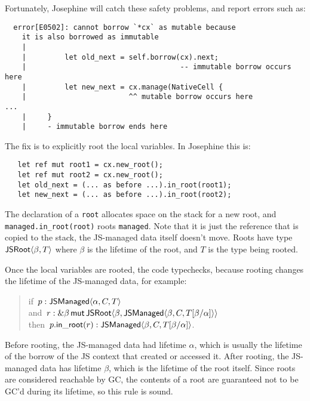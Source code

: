 Fortunately, Josephine will catch these safety problems, and report
errors such as:
\begin{verbatim}
  error[E0502]: cannot borrow `*cx` as mutable because
    it is also borrowed as immutable
    |
    |         let old_next = self.borrow(cx).next;
    |                                    -- immutable borrow occurs here
    |         let new_next = cx.manage(NativeCell {
    |                        ^^ mutable borrow occurs here
...
    |     }
    |     - immutable borrow ends here
\end{verbatim}
The fix is to explicitly root the local variables. In Josephine this is:
\begin{verbatim}
   let ref mut root1 = cx.new_root();
   let ref mut root2 = cx.new_root();
   let old_next = (... as before ...).in_root(root1);
   let new_next = (... as before ...).in_root(root2);
\end{verbatim}
The declaration of a \verb|root| allocates space on the stack
for a new root, and \verb|managed.in_root(root)| roots \verb|managed|.
Note that it is just the reference that is copied to the stack,
the JS-managed data itself doesn't move.
Roots have type $\mathsf{JSRoot}\langle \beta,T\rangle$ where $\beta$ is the lifetime
of the root, and $T$ is the type being rooted.

Once the local variables are rooted, the code typechecks,
because rooting changes the lifetime of the JS-managed
data, for example:
\begin{quote}
  if~$p: \mathsf{JSManaged}\langle \alpha,C,T\rangle$ \\
  and~$r: \&\beta\,\mathsf{mut}\,{\mathsf{JSRoot}\langle \beta,\mathsf{JSManaged}\langle \beta,C,T[\beta/\alpha]\rangle\rangle}$ \\
  then~$p.\mathsf{in\_root}(r): \mathsf{JSManaged}\langle \beta,C,T[\beta/\alpha]\rangle$.
\end{quote}
Before rooting, the JS-managed data had lifetime $\alpha$,
which is usually the lifetime of the borrow of the JS context
that created or accessed it.
After rooting, the JS-managed data has lifetime $\beta$,
which is the lifetime of the root itself. Since roots are
considered reachable by GC, the contents of a root
are guaranteed not to be GC'd during its lifetime,
so this rule is sound.
